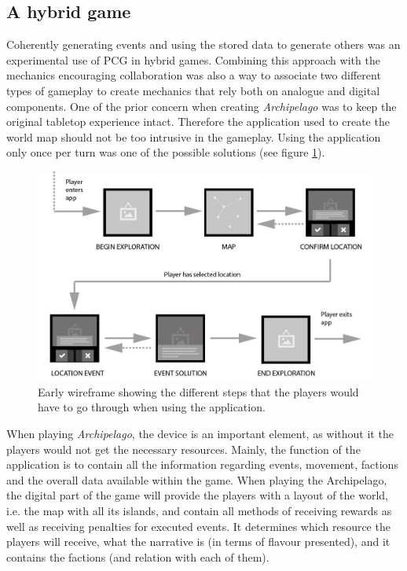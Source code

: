 \subsection{A hybrid game}
Coherently generating events and using the stored data to generate others was an experimental use of PCG in hybrid games. Combining this approach with the mechanics encouraging collaboration was also a way to associate two different types of gameplay to create mechanics that rely both on analogue and digital components. One of the prior concern when creating \textit{Archipelago} was to keep the original tabletop experience intact. Therefore the application used to create the world map should not be too intrusive in the gameplay. Using the application only once per turn was one of the possible solutions (see figure \ref{fig:wireframe}).
\begin{figure}[h]
    \centering
    \includegraphics[width=\textwidth]{Images/wire.jpg}
    \caption{Early wireframe showing the different steps that the players would have to go through when using the application.}
    \label{fig:wireframe}
\end{figure}
When playing \textit{Archipelago}, the device is an important element, as without it the players would not get the necessary resources.
Mainly, the function of the application is to contain all the information regarding events, movement, factions and the overall data available within the game. 
When playing the Archipelago, the digital part of the game will provide the players with a layout of the world, i.e. the map with all its islands, and contain all methods of receiving rewards as well as receiving penalties for executed events. It determines which resource the players will receive, what the narrative is (in terms of flavour presented), and it contains the factions (and relation with each of them).

